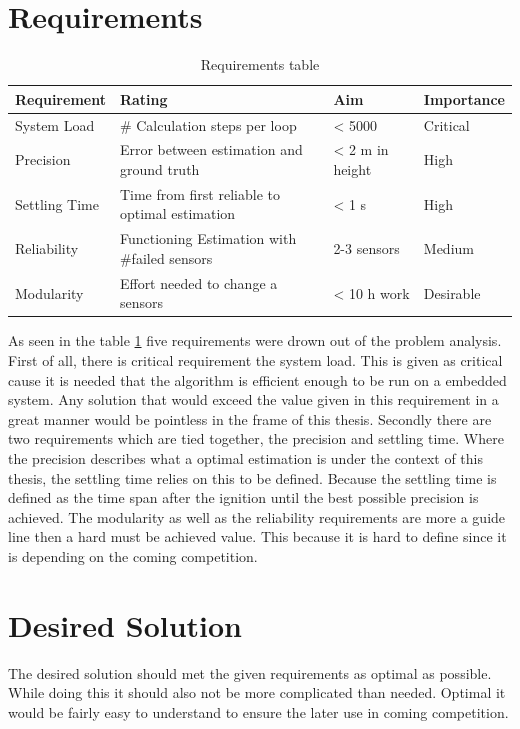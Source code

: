  \section{Requirements}
 
 \begin{table}[h]
 \centering
 \begin{tabular}{|l|l|l|l|}	
 \hline	
 \bf{Requirement}   & \bf{Rating} & \bf{Aim} & \bf{Importance} \\ \hline
 System Load   & \# Calculation steps per loop & < 5000 & Critical \\ \hline
 Precision     & Error between estimation and ground truth  & < 2 m in height & High  \\ \hline
 Settling Time & Time from first reliable to optimal estimation  & < 1 s &  High \\ \hline
 Reliability   & Functioning Estimation with \#failed sensors & 2-3 sensors & Medium \\ \hline	
 Modularity    & Effort needed to change a sensors & < 10 h work &  Desirable \\ \hline
 \end{tabular}	
 \caption{Requirements table}
 \label{tab:Requirements}
 \end{table}
 
 As seen in the table \ref{tab:Requirements} five requirements were drown out of the problem analysis. 
 First of all, there is critical requirement the system load. This is given as critical cause it is needed that the algorithm is efficient enough to be run on a embedded system.
 Any solution that would exceed the value given in this requirement in a great manner would be pointless in the frame of this thesis.
 Secondly there are two requirements which are tied together, the precision and settling time.
 Where the precision describes what a optimal estimation is under the context of this thesis, the settling time relies on this to be defined.
 Because the settling time is defined as the time span after the ignition until the best possible precision is achieved.
 The modularity as well as the reliability requirements are more a guide line then a hard must be achieved value.
 This because it is hard to define since it is depending on the coming competition.
 
 \section{Desired Solution}
 The desired solution should met the given requirements as optimal as possible. 
 While doing this it should also not be more complicated than needed.
 Optimal it would be fairly easy to understand to ensure the later use in coming competition.
